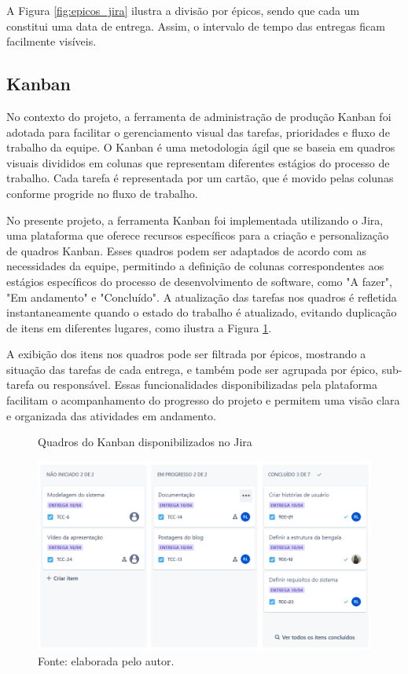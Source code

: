     A Figura \ref{fig:epicos_jira} ilustra a divisão por épicos, sendo que cada um constitui uma data de entrega. Assim, o intervalo de tempo das entregas ficam facilmente visíveis. 

    
    \subsection{Kanban}
    No contexto do projeto, a ferramenta de administração de produção Kanban foi adotada para facilitar o gerenciamento visual das tarefas, prioridades e fluxo de trabalho da equipe. O Kanban é uma metodologia ágil que se baseia em quadros visuais divididos em colunas que representam diferentes estágios do processo de trabalho. Cada tarefa é representada por um cartão, que é movido pelas colunas conforme progride no fluxo de trabalho.

    No presente projeto, a ferramenta Kanban foi implementada utilizando o Jira, uma plataforma que oferece recursos específicos para a criação e personalização de quadros Kanban. Esses quadros podem ser adaptados de acordo com as necessidades da equipe, permitindo a definição de colunas correspondentes aos estágios específicos do processo de desenvolvimento de software, como "A fazer", "Em andamento" e "Concluído". A atualização das tarefas nos quadros é refletida instantaneamente quando o estado do trabalho é atualizado, evitando duplicação de itens em diferentes lugares, como ilustra a Figura \ref{fig:kanban}.
    
    A exibição dos itens nos quadros pode ser filtrada por épicos, mostrando a situação das tarefas de cada entrega, e também pode ser agrupada por épico, sub-tarefa ou responsável. Essas funcionalidades disponibilizadas pela plataforma facilitam o acompanhamento do progresso do projeto e permitem uma visão clara e organizada das atividades em andamento.

    \begin{figure}[h!]
        \captionsetup{width=1\textwidth}
        \caption{\label{fig:kanban} Quadros do Kanban disponibilizados no Jira}
        \centering
        \includegraphics[width=1\textwidth]{figuras/kanban} 
        \caption*{Fonte: elaborada pelo autor.}
    \end{figure}

